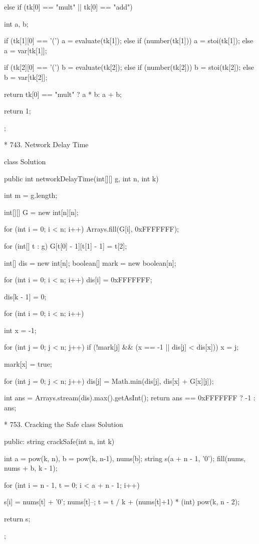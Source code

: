 {{{					else if (tk[0] == "mult" || tk[0] == "add") {
						int a, b;

						if (tk[1][0] == '(')
							a = evaluate(tk[1]);
						else if (number(tk[1]))
							a = stoi(tk[1]);
						else
							a = var[tk[1]];

						if (tk[2][0] == '(')
							b = evaluate(tk[2]);
						else if (number(tk[2]))
							b = stoi(tk[2]);
						else
							b = var[tk[2]];

						return tk[0] == "mult" ? a * b: a + b;
					}
				}
				return 1;
			}
		};

* 743. Network Delay Time

		class Solution {
			public int networkDelayTime(int[][] g, int n, int k) {
				int m = g.length;

				int[][] G = new int[n][n];

				for (int i = 0; i < n; i++) {
					Arrays.fill(G[i], 0xFFFFFFF);
				}

				for (int[] t : g) {
					G[t[0] - 1][t[1] - 1] = t[2];
				}

				int[] dis = new int[n];
				boolean[] mark = new boolean[n];

				for (int i = 0; i < n; i++) {
					dis[i] = 0xFFFFFFF;
				}

				dis[k - 1] = 0;

				for (int i = 0; i < n; i++) {

					int x = -1;

					for (int j = 0; j < n; j++) {
						if (!mark[j] && (x == -1 || dis[j] < dis[x])) {
							x = j;
						}
					}

					mark[x] = true;

					for (int j = 0; j < n; j++) {
						dis[j] = Math.min(dis[j], dis[x] + G[x][j]);
					}

				}

				int ans = Arrays.stream(dis).max().getAsInt();
				return ans == 0xFFFFFFF ? -1 : ans;
			}
		}


* 753. Cracking the Safe
		class Solution {
		public:
			string crackSafe(int n, int k) {
				int a = pow(k, n), b = pow(k, n-1), nums[b];
				string s(a + n - 1, '0');
				fill(nums, nums + b, k - 1);

				for (int i =  n - 1, t = 0; i < a + n - 1; i++) {
					s[i] = nums[t] + '0';
					nums[t]--;
					t = t / k + (nums[t]+1) * (int) pow(k, n - 2);
					
				}

				return s;
			}
		};